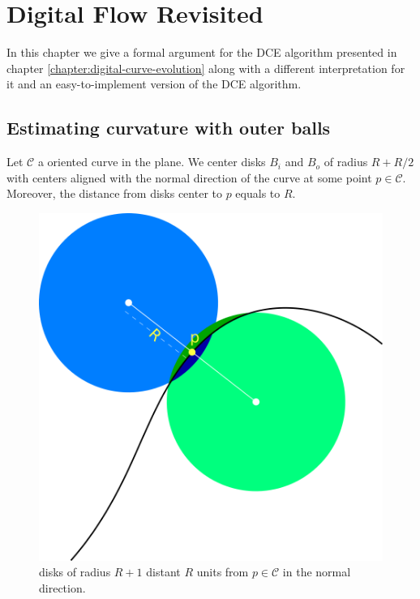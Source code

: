 \chapter{Digital Flow Revisited}
\label{chapter:digital-flow-revisited}

In this chapter we give a formal argument for the DCE algorithm presented in chapter \ref{chapter:digital-curve-evolution} along with a different interpretation for it and an easy-to-implement version of the DCE algorithm.

\section{Estimating curvature with outer balls}

Let $\mathcal{C}$ a oriented curve in the plane. We center disks $B_i$ and $B_o$ of radius $R+R/2$ with centers aligned with the normal direction of the curve at some point $p \in \mathcal{C}$. Moreover, the distance from disks center to $p$ equals to $R$.

\begin{figure}
\center
\includegraphics[scale=0.35]{figures/appendix-max-energy/r-separated-disks.png}
\caption{disks of radius $R+1$ distant $R$ units from $p\in \mathcal{C}$ in the normal direction.}
\label{fig:r-separated-disks}
\end{figure}

